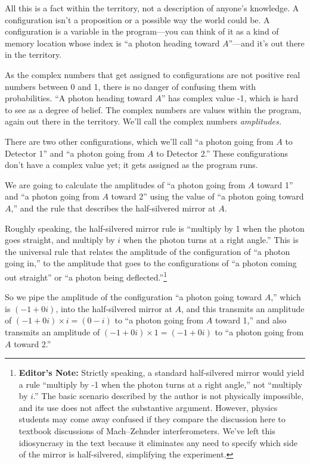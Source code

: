 {
 All this is a fact within the territory, not a description of
anyone's knowledge. A configuration
isn't a proposition or a possible way the world could
be. A configuration is a variable in the program---you can think of it
as a kind of memory location whose index is ``a photon
heading toward $A$''---and it's out
there in the territory.}

{
 As the complex numbers that get assigned to configurations are not
positive real numbers between 0 and 1, there is no danger of confusing
them with probabilities. ``A photon heading toward
$A$'' has complex value -1, which is hard to see as a
degree of belief. The complex numbers are values within the program,
again out there in the territory. We'll call the
complex numbers \textit{amplitudes.}}

{
 There are two other configurations, which we'll
call ``a photon going from $A$ to Detector
1'' and ``a photon going from $A$ to
Detector 2.'' These configurations
don't have a complex value yet; it gets assigned as the
program runs.}

{
 We are going to calculate the amplitudes of ``a
photon going from $A$ toward 1'' and
``a photon going from $A$ toward 2''
using the value of ``a photon going toward
$A$,'' and the rule that describes the half-silvered
mirror at $A$.}

{
 Roughly speaking, the half-silvered mirror rule is
``multiply by 1 when the photon goes straight, and
multiply by $i$ when the photon turns at a right
angle.'' This is the universal rule that relates the
amplitude of the configuration of ``a photon going
in,'' to the amplitude that goes to the
configurations of ``a photon coming out
straight'' or ``a photon being
deflected.''\footnote{\textbf{Editor's Note:} Strictly speaking, a
standard half-silvered mirror would yield a rule
``multiply by -1 when the photon turns at a right
angle,'' not ``multiply by
$i$.'' The basic scenario described by the author is
not physically impossible, and its use does not affect the substantive
argument. However, physics students may come away confused if they
compare the discussion here to textbook discussions of Mach--Zehnder
interferometers. We've left this idiosyncrasy in the
text because it eliminates any need to specify which side of the mirror
is half-silvered, simplifying the experiment.}}

{
 So we pipe the amplitude of the configuration ``a
photon going toward $A$,'' which is $(-1 + 0i)$, into the
half-silvered mirror at $A$, and this transmits an amplitude of $(-1 + 0i) 
\times i = (0 -i)$ to ``a photon going from $A$
toward 1,'' and also transmits an amplitude of $(-1 +
0i) \times 1 = (-1 + 0i)$ to ``a photon going
from $A$ toward 2.''}

